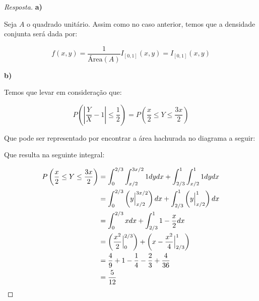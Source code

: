 \documentclass[
]{article}
\theoremstyle{definition}
\theoremstyle{definition}
\theoremstyle{definition}
\theoremstyle{definition}
\theoremstyle{remark}
\begin{document}
\begin{proof}[Resposta]
\textbf{a)}

Seja \(A\) o quadrado unitário. Assim como no caso anterior, temos que a densidade conjunta será dada por:

\begin{equation*}
f(x,y) = \frac{1}{\text{Área}(A)}I_{[0,1]}(x,y) = I_{[0,1]}(x,y)
\end{equation*}

\textbf{b)}

Temos que levar em consideração que:

\begin{equation*}
P\left(\left|\frac{Y}{X} - 1\right|\le \frac{1}{2}\right) = P\left(\frac{x}{2} \le Y \le \frac{3x}{2}\right)
\end{equation*}

Que pode ser representado por encontrar a área hachurada no diagrama a seguir:

\begin{center}
\end{center}

Que resulta na seguinte integral:

\begin{align*}
P\left(\frac{x}{2} \le Y \le \frac{3x}{2}\right) &= \int_{0}^{2/3}\int_{x/2}^{3x/2}1dydx + \int_{2/3}^{1}\int_{x/2}^{1}1dydx \\
&= \int_{0}^{2/3}\left(y\Big{|}_{x/2}^{3x/2}\right)dx + \int_{2/3}^{1}\left(y\Big{|}_{x/2}^{1}\right)dx \\
&= \int_{0}^{2/3}xdx + \int_{2/3}^{1}1-\frac{x}{2}dx \\
&= \left(\frac{x^{2}}{2}\Big{|}_{0}^{2/3}\right) + \left(x - \frac{x^{2}}{4}\Big{|}_{2/3}^{1}\right) \\
&= \frac{4}{9} + 1 - \frac{1}{4} - \frac{2}{3} + \frac{4}{36} \\
&= \frac{5}{12}
\end{align*}


\end{proof}
\end{document}
